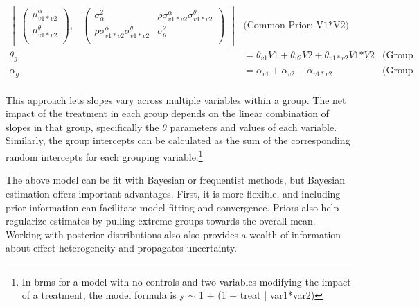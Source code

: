 \documentclass[12pt]{article}
\begin{document}
\begin{align*}
\begin{bmatrix}
\begin{pmatrix}
\mu^\alpha_{v1*v2} \\
\mu^\theta_{v1*v2} \\
\end{pmatrix}\!\!,&
\begin{pmatrix}
\sigma^2_\alpha & \rho \sigma^\alpha_{v1*v2} \sigma^\theta_{v1*v2} \\
\rho \sigma^\alpha_{v1*v2} \sigma^\theta_{v1*v2} & \sigma^2_\theta \\
\end{pmatrix}
\end{bmatrix} & \text{(Common Prior: V1*V2)} \\ 
\theta_g &= \theta_{v1} \textit{V1} + \theta_{v2} \textit{V2} + \theta_{v1*v2} \textit{V1*V2} & \text{(Group Slopes)} \\
\alpha_g &= \alpha_{v1} + \alpha_{v2} + \alpha_{v1*v2} & \text{(Group Intercepts)} \\
\end{align*}


This approach lets slopes vary across multiple variables within a group. 
The net impact of the treatment in each group depends on the linear combination of slopes in that group, specifically the $\theta$ parameters and values of each variable. 
Similarly, the group intercepts can be calculated as the sum of the corresponding random intercepts for each grouping variable.\footnote{In brms for a model with no controls and two variables modifying the impact of a treatment, the model formula is y $\sim$ 1 + (1 + treat | var1*var2)}  




The above model can be fit with Bayesian or frequentist methods, but Bayesian estimation offers important advantages.
First, it is more flexible, and including prior information can facilitate model fitting and convergence. 
Priors also help regularize estimates by pulling extreme groups towards the overall mean.
Working with posterior distributions also also provides a wealth of information about effect heterogeneity and propagates uncertainty.  
\end{document}
